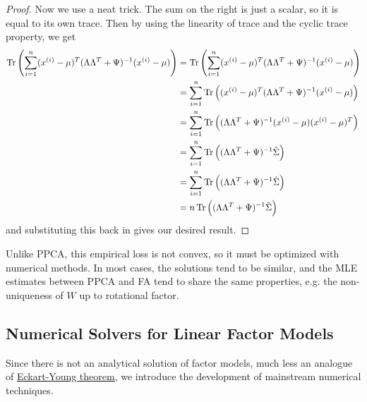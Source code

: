 \begin{proof}
    Now we use a neat trick. The sum on the right is just a scalar, so it is equal to its own trace. Then by using the linearity of trace and the cyclic trace property, we get 
    \begin{align}
      \operatorname{Tr} \left( \sum_{i=1}^n (x^{(i)} - \mu)^T (\Lambda \Lambda^T + \Psi)^{-1} (x^{(i)} - \mu) \right) 
      & = \operatorname{Tr} \left( \sum_{i=1}^n (x^{(i)} - \mu)^T (\Lambda \Lambda^T + \Psi)^{-1} (x^{(i)} - \mu) \right) \\ 
      & = \sum_{i=1}^n \operatorname{Tr} \left( (x^{(i)} - \mu)^T (\Lambda \Lambda^T + \Psi)^{-1} (x^{(i)} - \mu) \right) \\ 
      & = \sum_{i=1}^n \operatorname{Tr} \left( (\Lambda \Lambda^T + \Psi)^{-1} (x^{(i)} - \mu) (x^{(i)} - \mu)^T \right) \\ 
      & = \sum_{i=1}^n \operatorname{Tr} \left( (\Lambda \Lambda^T + \Psi)^{-1} \hat{\Sigma} \right) \\ 
      & = \sum_{i=1}^n \operatorname{Tr} \left( (\Lambda \Lambda^T + \Psi)^{-1} \hat{\Sigma} \right) \\ 
      & = n \operatorname{Tr} \left( (\Lambda \Lambda^T + \Psi)^{-1} \hat{\Sigma} \right)
    \end{align}
    and substituting this back in gives our desired result. 
  \end{proof}

  Unlike PPCA, this empirical loss is not convex, so it must be optimized with numerical methods. In most cases, the solutions tend to be similar, and the MLE estimates between PPCA and FA tend to share the same properties, e.g. the non-uniqueness of $W$ up to rotational factor. 

\subsection{Numerical Solvers for Linear Factor Models}
  
  Since there is not an analytical solution of factor models, much less an analogue of \hyperref[thm:eckart-young-theorem]{Eckart-Young theorem}, we introduce the development of mainstream numerical techniques. 

